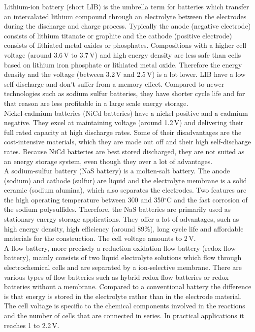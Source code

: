\documentclass[12pt,a4paper]{article}
\begin{document}
\begin{parcolumns}[colwidths={1=2.5 cm, 2=10 cm, 3=2.5cm}]{3}
{Lithium-ion battery (short LIB) is the umbrella term for batteries which transfer an intercalated lithium compound through an electrolyte between the electrodes during the discharge and charge process. Typically the anode (negative electrode) consists of lithium titanate or graphite and the cathode (positive electrode) consists of lithiated metal oxides or phosphates. Compositions with a higher cell voltage (around 3.6\,V to 3.7\,V) and high energy density are less safe than cells based on lithium iron phosphate or lithiated metal oxide. Therefore the energy density and the voltage (between 3.2\,V and 2.5\,V) is a lot lower. LIB have a low self-discharge and don't suffer from a memory effect. Compared to newer technologies such as sodium sulfur batteries, they have shorter cycle life and for that reason are less profitable in a large scale energy storage.\\ Nickel-cadmium batteries (NiCd batteries) have a nickel positive and a cadmium negative. They excel at maintaining voltage (around 1.2\,V)  and delivering their full rated capacity at high discharge rates. Some of their disadvantages are the cost-intensive materials, which they are made out off and their high self-discharge rates. Because NiCd batteries are best stored discharged, they are not suited as an energy storage system, even though they over a lot of advantages.\\A sodium-sulfur battery (NaS battery) is a molten-salt battery. The anode (sodium) and cathode (sulfur) are liquid and the electrolyte membrane is a solid ceramic (sodium alumina), which also separates the electrodes. Two features are the high operating temperature between 300 and 350$^\circ$C  and the fast corrosion of the sodium polysulfides. Therefore, the NaS batteries are primarily used as stationary energy storage applications. They offer a lot of advantages, such as high energy density, high efficiency (around 89$\%$), long cycle life and affordable materials for the construction. The cell voltage amounts to 2\,V.
\\A flow battery, more precisely a reduction-oxidation flow battery (redox flow battery), mainly consists of two liquid electrolyte solutions which flow through electrochemical cells and are separated by a ion-selective membrane. There are various types of flow batteries such as hybrid redox flow batteries or redox batteries without a membrane. Compared to a conventional battery the difference is that energy is stored in the electrolyte rather than in the electrode material. The cell voltage is specific to the chemical components involved in the reactions and the number of cells that are connected in series. In practical applications it reaches 1 to 2.2\,V. 
}
\end{parcolumns}
\end{document}
